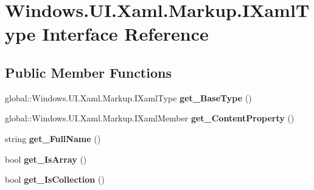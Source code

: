 \hypertarget{interface_windows_1_1_u_i_1_1_xaml_1_1_markup_1_1_i_xaml_type}{}\section{Windows.\+U\+I.\+Xaml.\+Markup.\+I\+Xaml\+Type Interface Reference}
\label{interface_windows_1_1_u_i_1_1_xaml_1_1_markup_1_1_i_xaml_type}
\subsection*{Public Member Functions}
\begin{DoxyCompactItemize}
\item 
\mbox{\label{interface_windows_1_1_u_i_1_1_xaml_1_1_markup_1_1_i_xaml_type_a25118da9dba36c6dcde8724ccbe078b0}} 
global\+::\+Windows.\+U\+I.\+Xaml.\+Markup.\+I\+Xaml\+Type {\bfseries get\+\_\+\+Base\+Type} ()
\item 
\mbox{\label{interface_windows_1_1_u_i_1_1_xaml_1_1_markup_1_1_i_xaml_type_aa0f823851084ebadb94e1bc55468b1dc}} 
global\+::\+Windows.\+U\+I.\+Xaml.\+Markup.\+I\+Xaml\+Member {\bfseries get\+\_\+\+Content\+Property} ()
\item 
\mbox{\label{interface_windows_1_1_u_i_1_1_xaml_1_1_markup_1_1_i_xaml_type_a5c1dd332e5b51cd2bb878fc56640a7a8}} 
string {\bfseries get\+\_\+\+Full\+Name} ()
\item 
\mbox{\label{interface_windows_1_1_u_i_1_1_xaml_1_1_markup_1_1_i_xaml_type_a16b5c5eaeeaad7ca4f010931852df7e4}} 
bool {\bfseries get\+\_\+\+Is\+Array} ()
\item 
\mbox{\label{interface_windows_1_1_u_i_1_1_xaml_1_1_markup_1_1_i_xaml_type_a979e0b0e073ddfb9b26002ca80cd7af7}} 
bool {\bfseries get\+\_\+\+Is\+Collection} ()
\item 
\mbox{\label{interface_windows_1_1_u_i_1_1_xaml_1_1_markup_1_1_i_xaml_type_a36b2295d77f635d1f86673a460235f92}} 

\end{DoxyCompactItemize}
